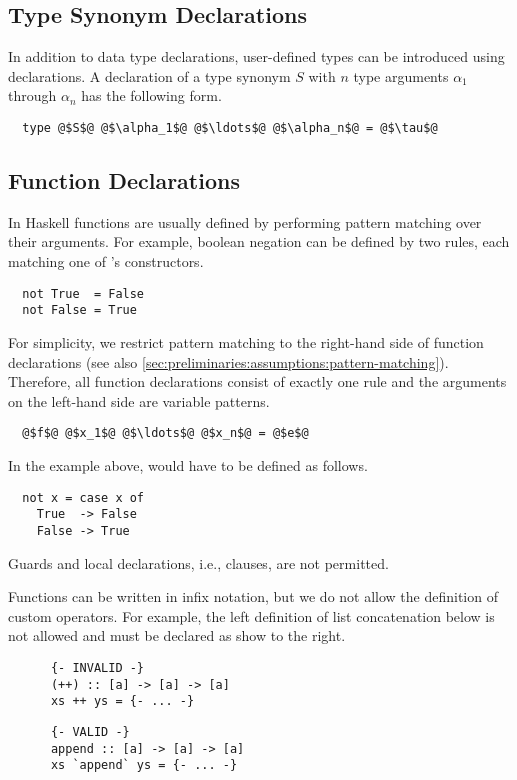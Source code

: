\subsection{Type Synonym Declarations} \label{sec:preliminaries:assumptions:type-decl}
In addition to data type declarations, user-defined types can be introduced using  declarations.
A declaration of a type synonym $S$ with $n$ type arguments $\alpha_1$ through $\alpha_n$ has the following form.
\begin{verbatim}
  type @$S$@ @$\alpha_1$@ @$\ldots$@ @$\alpha_n$@ = @$\tau$@
\end{verbatim}

\subsection{Function Declarations} \label{sec:preliminaries:assumptions:func-decl}
In Haskell functions are usually defined by performing pattern matching over their arguments.
For example, boolean negation can be defined by two rules, each matching one of 's constructors.
\begin{verbatim}
  not True  = False
  not False = True
\end{verbatim}
For simplicity, we restrict pattern matching to the right-hand side of function declarations (see also \autoref{sec:preliminaries:assumptions:pattern-matching}).
Therefore, all function declarations consist of exactly one rule and the arguments on the left-hand side are variable patterns.
\begin{verbatim}
  @$f$@ @$x_1$@ @$\ldots$@ @$x_n$@ = @$e$@
\end{verbatim}
In the example above,  would have to be defined as follows.
\begin{verbatim}
  not x = case x of
    True  -> False
    False -> True
\end{verbatim}
Guards and local declarations, i.e.,  clauses, are not permitted.

Functions can be written in infix notation, but we do not allow the definition of custom operators.
For example, the left definition of list concatenation below is not allowed and must be declared as show to the right.
\begin{center}
  \begin{minipage}[t]{0.35\textwidth}
    \begin{verbatim}
      {- INVALID -}
      (++) :: [a] -> [a] -> [a]
      xs ++ ys = {- ... -}
    \end{verbatim}
  \end{minipage}
  \begin{minipage}[t]{0.35\textwidth}
    \begin{verbatim}
      {- VALID -}
      append :: [a] -> [a] -> [a]
      xs `append` ys = {- ... -}
    \end{verbatim}
  \end{minipage}
\end{center}

